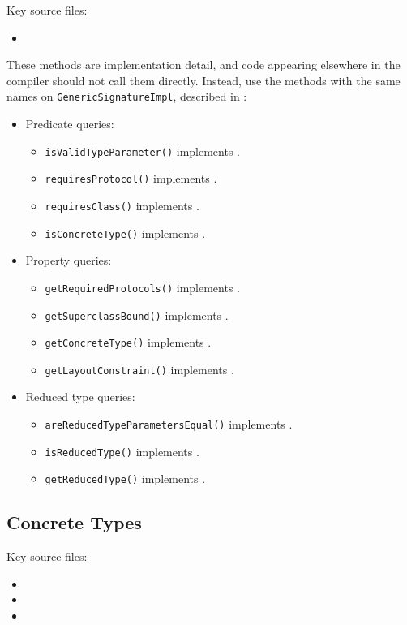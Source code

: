 \documentclass[../generics]{subfiles}
\begin{document}
Key source files:
\begin{itemize}
\item {}
\end{itemize}

These methods are implementation detail, and code appearing elsewhere in the compiler should not call them directly. Instead, use the methods with the same names on \texttt{GenericSignatureImpl}, described in :
\begin{itemize}
\item Predicate queries:
\begin{itemize}
\item {}\texttt{isValidTypeParameter()} implements .
\item {}\texttt{requiresProtocol()} implements .
\item {}\texttt{requiresClass()} implements .
\item {}\texttt{isConcreteType()} implements .
\end{itemize}
\item Property queries:
\begin{itemize}
\item {}\texttt{getRequiredProtocols()} implements .
\item {}\texttt{getSuperclassBound()} implements .
\item {}\texttt{getConcreteType()} implements .
\item {}\texttt{getLayoutConstraint()} implements .
\end{itemize}
\item Reduced type queries:
\begin{itemize}
\item {}\texttt{areReducedTypeParametersEqual()} implements .
\item {}\texttt{isReducedType()} implements .
\item {}\texttt{getReducedType()} implements .
\end{itemize}
\end{itemize}

\subsection*{Concrete Types}

Key source files:
\begin{itemize}
\item {}
\item {}
\item {}
\end{itemize}
\end{document}
